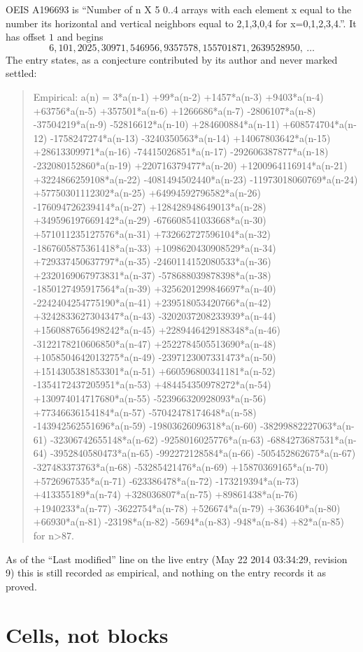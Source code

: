 \documentclass[11pt,a4paper]{article}
\theoremstyle{plain}
\theoremstyle{definition}
\begin{document}
OEIS A196693 is ``Number of n X 5 0..4 arrays with each element x equal to the number its horizontal and vertical neighbors equal to 2,1,3,0,4 for x=0,1,2,3,4.''. It has offset $1$ and begins
\[
6, 101, 2025, 30971, 546956, 9357578, 155701871, 2639528950,\ \dots
\]
The entry states, as a conjecture contributed by its author and never marked settled:
\begin{quote}
Empirical: a(n) = 3*a(n-1) +99*a(n-2) +1457*a(n-3) +9403*a(n-4) +63756*a(n-5) +357501*a(n-6) +1266686*a(n-7) -2806107*a(n-8) -37504219*a(n-9) -52816612*a(n-10) +284600884*a(n-11) +608574704*a(n-12) -1758247274*a(n-13) -3240350563*a(n-14) +14067803642*a(n-15) +28613309971*a(n-16) -74415026851*a(n-17) -292606387877*a(n-18) -232080152860*a(n-19) +220716379477*a(n-20) +1200964116914*a(n-21) +3224866259108*a(n-22) -4081494502440*a(n-23) -11973018060769*a(n-24) +57750301112302*a(n-25) +64994592796582*a(n-26) -176094726239414*a(n-27) +128428948649013*a(n-28) +349596197669142*a(n-29) -676608541033668*a(n-30) +571011235127576*a(n-31) +732662727596104*a(n-32) -1867605875361418*a(n-33) +1098620430908529*a(n-34) +729337450637797*a(n-35) -2460114152080533*a(n-36) +2320169067973831*a(n-37) -578688039878398*a(n-38) -1850127495917564*a(n-39) +3256201299846697*a(n-40) -2242404254775190*a(n-41) +239518053420766*a(n-42) +3242833627304347*a(n-43) -3202037208233939*a(n-44) +1560887656498242*a(n-45) +2289446429188348*a(n-46) -3122178210606850*a(n-47) +2522784505513690*a(n-48) +1058504642013275*a(n-49) -2397123007331473*a(n-50) +1514305381853301*a(n-51) +660596800341181*a(n-52) -1354172437205951*a(n-53) +484454350978272*a(n-54) +130974014717680*a(n-55) -523966320928093*a(n-56) +77346636154184*a(n-57) -57042478174648*a(n-58) -143942562551696*a(n-59) -19803626096318*a(n-60) -38299882227063*a(n-61) -32306742655148*a(n-62) -9258016025776*a(n-63) -6884273687531*a(n-64) -3952840580473*a(n-65) -992272128584*a(n-66) -505452862675*a(n-67) -327483373763*a(n-68) -53285421476*a(n-69) +15870369165*a(n-70) +5726967535*a(n-71) -623386478*a(n-72) -173219394*a(n-73) +413355189*a(n-74) +328036807*a(n-75) +89861438*a(n-76) +1940233*a(n-77) -3622754*a(n-78) +526674*a(n-79) +363640*a(n-80) +66930*a(n-81) -23198*a(n-82) -5694*a(n-83) -948*a(n-84) +82*a(n-85) for n>87.
\end{quote}
As of the ``Last modified'' line on the live entry (May 22 2014 03:34:29, revision 9) this is still
recorded as empirical, and nothing on the entry records it as proved.

\section{Cells, not blocks}
\end{document}
